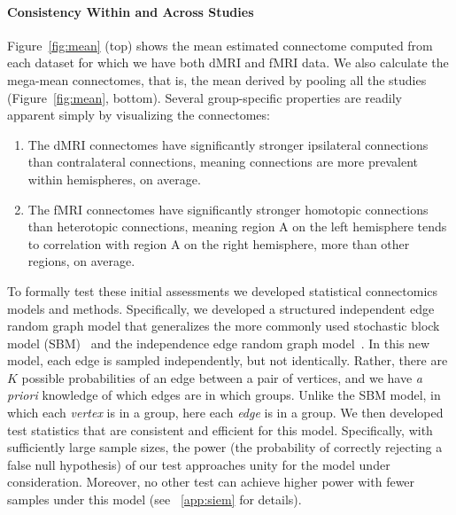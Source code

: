 \documentclass[11pt]{article}
\begin{document}
\begin{multicols}{2}
\paragraph{Consistency Within and Across Studies}




Figure~\ref{fig:mean} (top) shows the mean estimated connectome computed from each dataset for which we have both dMRI and fMRI data.  We also calculate the  mega-mean connectomes, that is, the mean derived by pooling all the studies (Figure~\ref{fig:mean}, bottom).  Several group-specific properties are readily apparent simply by visualizing the connectomes:
\begin{enumerate}[wide, labelwidth=!, labelindent=0pt, label=\bf{\arabic*)}]
        \item The dMRI connectomes have significantly stronger ipsilateral connections than contralateral connections, meaning connections are more prevalent within hemispheres, on average.
        \item The fMRI connectomes have significantly stronger homotopic connections than heterotopic connections, meaning region A on the left hemisphere tends to correlation with region A on the right hemisphere, more than other regions, on average. 
\end{enumerate}

To formally test these initial assessments we developed statistical connectomics models and methods. Specifically, we developed a structured independent edge random graph model that generalizes the more commonly used  stochastic block model (SBM)~\cite{Holland83} and the independence edge random graph model~\cite{Bollobas2009}. In this new model, each edge is sampled independently, but not identically. Rather, there are $K$ possible probabilities of an edge between a pair of vertices, and we have \emph{a priori} knowledge of which edges are in which groups.  Unlike the SBM 
 model, in which each \emph{vertex} is in a group, here each \emph{edge} is in a group.  We then developed test statistics that are consistent and efficient for this model. Specifically, with sufficiently large sample sizes, the power (the probability of correctly rejecting a false null hypothesis) of our test approaches unity for the model under consideration.  Moreover, no other test can achieve higher power with fewer samples under this model (see ~\ref{app:siem} for details).


\end{multicols}
\end{document}
